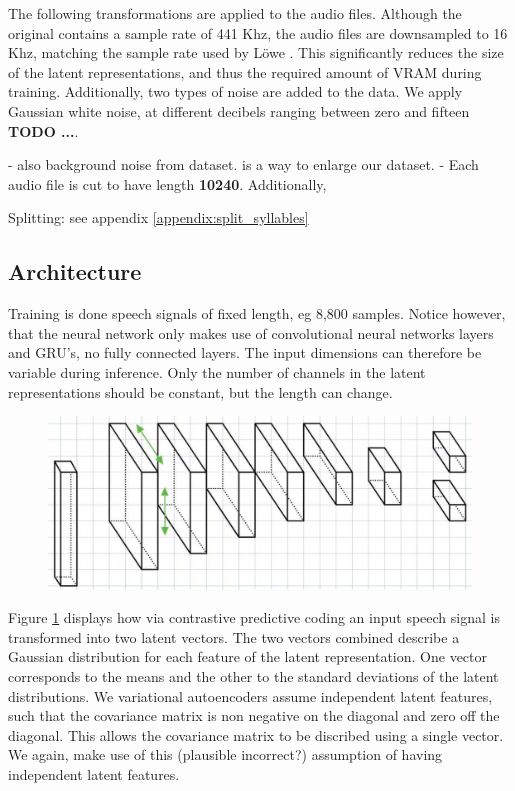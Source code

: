 		The following transformations are applied to the audio files. Although the original contains a sample rate of 441 Khz, the audio files are downsampled to 16 Khz, matching the sample rate used by Löwe \cite{lowePuttingEndEndtoEnd2020}. This significantly reduces the size of the latent representations, and thus the required amount of VRAM during training. Additionally, two types of noise are added to the data. We apply Gaussian white noise, at different decibels ranging between zero and fifteen \textbf{TODO ...}.
		
		- also background noise from dataset. is a way to enlarge our dataset. 
		- Each audio file is cut to have length \textbf{10240}. Additionally, 
		
		
		Splitting: see appendix  \ref{appendix:split_syllables}
		
	\subsection{Architecture}
			Training is done speech signals of fixed length, eg 8,800 samples. Notice however, that the neural network only makes use of convolutional neural networks layers and GRU's, no fully connected layers. The input dimensions can therefore be variable during inference. Only the number of channels in the latent representations should be constant, but the length can change.
			
		\begin{figure}[h]
			\centering
			\includegraphics[width=0.7\linewidth]{architecture}
			\caption{}
			\label{fig:architecture}
		\end{figure}
	
		Figure \ref{fig:architecture} displays how via contrastive predictive coding an input speech signal is transformed into two latent vectors. The two vectors combined describe a Gaussian distribution for each feature of the latent representation. One vector corresponds to the means and the other to the standard deviations of the latent distributions. We variational autoencoders assume independent latent features, such that the covariance matrix is non negative on the diagonal and zero off the diagonal. This allows the covariance matrix to be discribed using a single vector. We again, make use of this (plausible incorrect?) assumption of having independent latent features.





